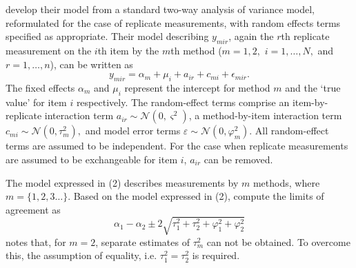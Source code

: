 \documentclass[12pt, a4paper]{report}
\theoremstyle{plain}
\theoremstyle{definition}
\theoremstyle{remark}
\begin{document}
		\citet{BXC2008} develop their model from a standard two-way analysis of variance model, reformulated for the case of replicate measurements, with random effects terms specified as appropriate. 
		Their model describing $y_{mir} $, again the $r$th replicate measurement on the $i$th item by the $m$th method ($m=1,2,$ $i=1,\ldots,N,$ and $r = 1,\ldots,n$), can be written as
		\begin{equation}\label{BXC-model}
		y_{mir}  = \alpha_{m} + \mu_{i} + a_{ir} + c_{mi} + \epsilon_{mir}.
		\end{equation}
		The fixed effects $\alpha_{m}$ and $\mu_{i}$  represent the intercept for method $m$ and the `true value' for item $i$ respectively. The random-effect terms comprise an item-by-replicate interaction term $a_{ir} \sim \mathcal{N}(0,\varsigma^{2})$, a method-by-item interaction term $c_{mi} \sim \mathcal{N}(0,\tau^{2}_{m}),$ and model error terms $\varepsilon \sim \mathcal{N}(0,\varphi^{2}_{m}).$ All random-effect terms are assumed to be independent.
		For the case when replicate measurements are assumed to be exchangeable for item $i$, $a_{ir}$ can be removed.
		
		The model expressed in (2) describes measurements by $m$ methods, where $m = \{1,2,3\ldots\}$. Based on the model expressed in (2), \citet{BXC2008} compute the limits of agreement as
		\[
		\alpha_1 - \alpha_2 \pm 2 \sqrt{ \tau^2_1 +  \tau^2_2 +  \varphi^2_1 +  \varphi^2_2 }
		\]
		\citet{BXC2008} notes that, for $m=2$,  separate estimates of $\tau^2_m$ can not be obtained. To overcome this, the assumption of equality, i.e. $\tau^2_1 = \tau^2_2$ is required.
		
		
		
	


\end{document}
